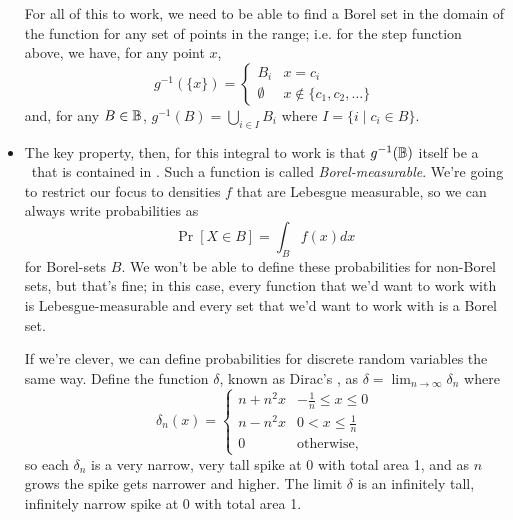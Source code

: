 \begin{itemize}
  For all of this to work, we need to be able to find a Borel set in
  the domain of the function for any set of points in the range;
  i.e. for the step function above, we have, for any point $x$,
  \begin{equation*}
    g^{-1}(\{x\}) =
    \begin{cases}
      B_i & x = c_i \\
      \emptyset & x \notin \{c_1, c_2,\dots\}
    \end{cases}
  \end{equation*}
  and, for any $B \in \mathbb{B}$, $g^{-1}(B) = \bigcup_{i \in I} B_i$ where
  $I = \{i \mid c_i \in B\}$.

\item The key property, then, for this integral to work is that
  $g^{-1}(\mathbb{B})$ itself be a \sigmaalgebra\ that is contained in \BB.  Such
  a function is called \emph{Borel-measurable}.  We're going to
  restrict our focus to densities $f$ that are Lebesgue measurable, so
  we can always write probabilities as
  \begin{equation*}
    \Pr[X \in B] = \int_B f(x) dx
  \end{equation*}
  for Borel-sets $B$.  We won't be able to define these probabilities
  for non-Borel sets, but that's fine; in this case, every function
  that we'd want to work with is Lebesgue-measurable and every set
  that we'd want to work with is a Borel set.

  If we're clever, we can define probabilities for discrete random
  variables the same way.  Define the function $\delta$, known as Dirac's
  \deltafunction, as $\delta = \lim_{n \to \infty} \delta_n$ where
  \begin{equation*}
    \delta_n(x) =
    \begin{cases}
      n + n^2 x & - \tfrac{1}{n} \leq x \leq 0 \\
      n - n^2 x & 0 < x \leq \tfrac{1}{n} \\
      0        & \text{otherwise},
    \end{cases}
  \end{equation*}
  so each $\delta_n$ is a very narrow, very tall spike at 0 with total area
  1, and as $n$ grows the spike gets narrower and higher.  The limit
  $\delta$ is an infinitely tall, infinitely narrow spike at 0 with total
  area 1.


\end{itemize}
